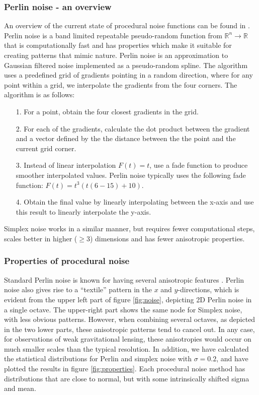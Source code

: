 \documentclass[aps,pre,twocolumn,letterpaper,floatfix,showpacs]{revtex4}
\begin{document}
\subsubsection{Perlin noise - an overview}
An overview of the current state of procedural noise functions can be
found in \cite{lagae:2010}.  Perlin noise \citep{perlin:2002} 
is a band limited repeatable pseudo-random function
from $\mathbb R^n \to \mathbb R$ that is computationally fast and has
properties which make it suitable for creating patterns that mimic
nature. Perlin noise is an approximation to Gaussian filtered noise
implemented as a pseudo-random spline. The algorithm uses a predefined
grid of gradients pointing in a random direction, where for any point
within a grid, we interpolate the gradients from the four corners. The
algorithm is as follows:
\begin{itemize}
  \item[1.] For a point, obtain the four closest gradients in the grid.
   \item [2.] For each of the gradients, calculate the dot product
     between the gradient and a vector defined by the  the distance
     between the the point and the current grid corner. 
   \item [3.] Instead of linear interpolation $F(t) = t$, use a fade function to produce smoother interpolated values. Perlin noise typically uses the following fade function: $F(t) = t ^3 (t  (6 - 15) + 10)$.
    \item [4.] Obtain the final value by linearly interpolating between the x-axis and
      use this result to linearly interpolate the y-axis. 
\end{itemize} 
Simplex noise works in a similar manner, but requires fewer
computational steps, scales better in higher ($\ge 3$) dimensions and has fewer 
anisotropic properties. 

\subsubsection{Properties of procedural noise}
Standard Perlin noise is known for having several anisotropic features
\citep{lagae:2010}. Perlin noise also gives rise to a ``textile''
pattern in the $x$ and $y$-directions, which is evident from the upper
left part of figure \ref{fig:noise}, depicting 2D Perlin noise in
a single octave. The upper-right part shows the same node for Simplex noise,
with less obvious patterns. However, when combining several octaves,
as depicted in the two lower parts, these anisotropic patterns tend to cancel
out. In any case, for observations of weak gravitational lensing, these anisotropies would occur on much smaller 
scales than the typical resolution. 
In addition, we have calculated the statistical distributions for Perlin and simplex noise
with $\sigma = 0.2$, and have plotted the results in figure \ref{fig:properties}.
Each procedural noise method has distributions that are close to normal, 
but with some intrinsically shifted sigma and mean. 
\end{document}
